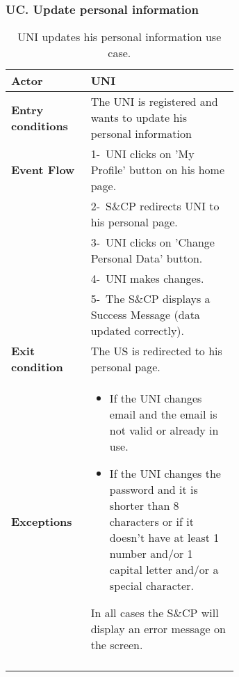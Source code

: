 \subsubsection*{UC\cuc . Update personal information}
\begin{center}
    \begin{longtable}{|l|p{0.65\linewidth}|}
        \hline
        \textbf{Actor}            & UNI \\
        \hline
        \textbf{Entry conditions} & The UNI is registered and wants to update his personal information\\
        \hline
        \textbf{Event Flow}       & 1-\ UNI clicks on 'My Profile' button on his home page. \\
        & 2-\ S\&CP redirects UNI to his personal page. \\
        & 3-\ UNI clicks on 'Change Personal Data' button.\\
        & 4-\ UNI makes changes.\\
        & 5-\ The S\&CP displays a Success Message (data updated correctly).\\
        \hline
        \textbf{Exit condition}   &  The US is redirected to his personal page. \\
        \hline
        \textbf{Exceptions}       & \begin{itemize}
            \item If the UNI changes email and the email is not valid or already in use. 
            \item If the UNI changes the password and it is shorter than 8 characters or if it doesn’t have at least 1 number and/or 1 capital letter and/or a special character.  
        \end{itemize} In all cases the S\&CP will display an error message on the screen.  \\
        \hline
        \caption{UNI updates his personal information use case.}
        \label{tab: pi_use_case}
    \end{longtable}
\end{center}

